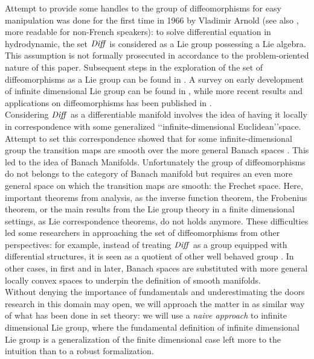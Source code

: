 Attempt to provide some handles to the group of diffeomorphisms for easy manipulation was done for the first time in 1966 by Vladimir Arnold \cite{arnold1966geometrie} (see also \cite{arnold1998topological}, more readable for non-French speakers): to solve differential equation in hydrodynamic, the set $\text{\emph{Diff}}$ is considered as a Lie group possessing a Lie algebra. This assumption is not formally prosecuted in accordance to the problem-oriented nature of this paper. Subsequent steps in the exploration of the set of diffeomorphisms as a Lie group can be found in \cite{marsden1970hamiltonian, ebin1970groups, omori1970group, leslie1983lie}. A survey on early development of infinite dimensional Lie group can be found in \cite{Milnor:84:remarks}, while more recent results and applications on diffeomorphisms has been published in \cite{ovsienko1992integrals, bauer2010sobolev,schmid2010infinite,  bauer2011geodesic}.\\

Considering $\text{\emph{Diff}}$ as a differentiable manifold involves the idea of having it locally in correspondence with some generalized \lq\lq infinite-dimensional Euclidean\rq\rq\phantom{z}space. Attempt to set this correspondence showed that for some infinite-dimensional group the transition maps are smooth over the more general Banach spaces \cite{khesin2008geometry}. This led to the idea of Banach Manifolds. Unfortunately the group of diffeomorphisms do not belongs to the category of Banach manifold but requires an even more general space on which the transition maps are smooth: the Frechet space. Here, important theorems from analysis, as the inverse function theorem, the Frobenius theorem, or the main results from the Lie group theory in a finite dimensional settings, as Lie correspondence theorems, do not holds anymore. These difficulties led some researchers in approaching the set of diffeomorphisms from other perspectives: 
for example, instead of treating $\text{\emph{Diff}}$ as a group equipped with differential structures, it is seen as a quotient of other well behaved group \cite{wojtynski1994one}. In other cases, in \cite{marsden1970hamiltonian} first and in \cite{milnor1984remarks} later, Banach spaces are substituted with more general locally convex spaces to underpin the definition of smooth manifolds. \\

Without denying the importance of fundamentals and underestimating the doors research in this domain may open, we will approach the matter in as similar way of what has been done in set theory: we will use a \emph{naive approach} to infinite dimensional Lie group, where the fundamental definition of infinite dimensional Lie group is a generalization of the finite dimensional case left more to the intuition than to a robust formalization. \\

